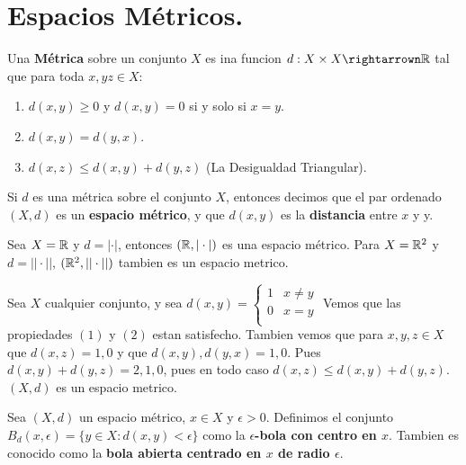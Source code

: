 
\section{Espacios M\'etricos.}

\begin{definition}
    Una \textbf{M\'etrica} sobre un conjunto $X$ es ina funcion  $d:X \times X \rightarrown \R$ tal
    que para toda $x,yz \in X$:
        \begin{enumerate}[label=(\arabic*)]
            \item $d(x,y) \geq 0$ y $d(x,y)=0$ si y solo si $x=y$.

            \item $d(x,y)=d(y,x)$.

            \item $d(x,z) \leq d(x,y)+d(y,z)$ (La Desigualdad Triangular).
        \end{enumerate}
        Si $d$ es una m\'etrica sobre el conjunto $X$, entonces decimos que el par ordenado  $(X,d)$
        es un \textbf{espacio m\'etrico}, y que $ d(x,y)$ es la \textbf{distancia} entre $x$ y y.
\end{definition}

\begin{example}
    Sea $X=\mathbb{R}$ y  $d=|\cdot|$, entonces $(\mathbb{R},|\cdot|)$ es una espacio m\'etrico. Para $X=\mathbb{R}^2$ y
    $d=||\cdot||$,  $(\mathbb{R}^2,||\cdot||)$ tambien es un espacio metrico.		
\end{example} 

\begin{example}
    Sea $X$ cualquier conjunto, y sea  $d(x,y)=\begin{cases} 1 & x \neq y \\ 0 & x=y \\\end{cases}$ 
    Vemos que las propiedades $(1)$ y $(2)$ estan satisfecho. Tambien vemos que para $x,y,z \in X$
    que  $d(x,z)=1,0$ y que $d(x,y),d(y,x)=1,0$. Pues $d(x,y)+d(y,z)=2,1,0$, pues en todo caso
    $d(x,z) \leq d(x,y)+d(y,z)$. $(X,d)$ es un espacio metrico.
\end{example} 

\begin{definition}
    Sea $(X,d)$ un espacio m\'etrico, $x \in X$ y  $\epsilon>0$. Definimos el conjunto
    $B_d(x,\epsilon)=\{y \in X: d(x,y)<\epsilon\}$ como la \textbf{$\epsilon$-bola con centro en
    $x$}. Tambien es conocido como la \textbf{bola abierta centrado en $x$ de radio  $\epsilon$}.
\end{definition}

